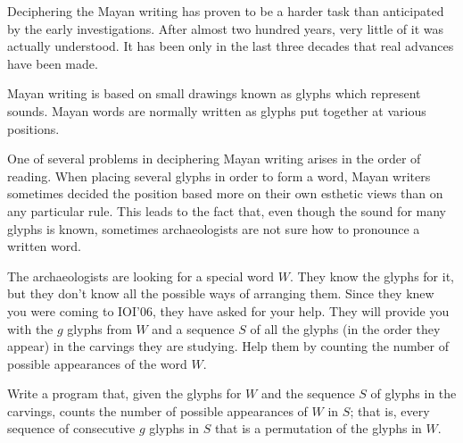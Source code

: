 Deciphering the Mayan writing has proven to be a harder task than anticipated by the early investigations. After almost two hundred years, very little of it was actually understood. It has been only in the last three decades that real advances have been made.

Mayan writing is based on small drawings known as glyphs which represent sounds. Mayan words are normally written as glyphs put together at various positions.

One of several problems in deciphering Mayan writing arises in the order of reading. When placing several glyphs in order to form a word, Mayan writers sometimes decided the position based more on their own esthetic views than on any particular rule. This leads to the fact that, even though the sound for many glyphs is known, sometimes archaeologists are not sure how to pronounce a written word.

The archaeologists are looking for a special word $W$. They know the glyphs for it, but they don't know all the possible ways of arranging them. Since they knew you were coming to IOI'06, they have asked for your help. They will provide you with the $g$ glyphs from $W$ and a sequence $S$ of all the glyphs (in the order they appear) in the carvings they are studying. Help them by counting the number of possible appearances of the word $W$.

Write a program that, given the glyphs for $W$ and the sequence $S$ of glyphs in the carvings, counts the number of possible appearances of $W$ in $S$; that is, every sequence of consecutive $g$ glyphs in $S$ that is a permutation of the glyphs in $W$.
